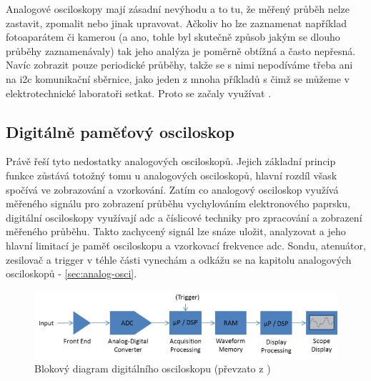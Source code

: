 \documentclass[12pt]{article}
\begin{document}
Analogové osciloskopy mají zásadní nevýhodu
a to tu, že měřený průběh nelze zastavit, zpomalit nebo jinak upravovat. Ačkoliv ho lze
zaznamenat například fotoaparátem či kamerou (a ano, tohle byl skutečně způsob jakým se
dlouho průběhy zaznamenávaly) tak jeho analýza je poměrně obtížná a často nepřesná.
Navíc zobrazit pouze periodické průběhy, takže se s nimi nepodíváme třeba ani na
\gls{i2c} komunikační sběrnice, jako jeden z mnoha příkladů s čimž se můžeme v elektrotechnické
laboratoři setkat. Proto se začaly využívat .

\subsection{Digitálně paměťový osciloskop}

Právě  řeší tyto nedostatky analogových osciloskopů. Jejich základní princip
funkce zůstává totožný tomu u analogových osciloskopů, hlavní rozdíl všask spočívá ve zobrazování
a vzorkování. Zatím co analogový osciloskop využívá měřeného signálu pro zobrazení průběhu
vychylováním elektronového paprsku, digitální osciloskopy využívají \acrfull{adc} a
číslicové techniky pro zpracování a zobrazení měřeného průběhu. Takto zachycený signál
lze snáze uložit, analyzovat a jeho hlavní limitací je paměť osciloskopu a vzorkovací frekvence
\acrshort{adc}. Sondu, atenuátor, zesilovač a trigger v téhle části vynechám a odkážu se na
kapitolu analogových osciloskopů - \ref{sec:analog-osci}.

\begin{figure}[h]
    \centering
    \includegraphics[width=\textwidth]{digital-oscilloscope-diagram}
    \caption{Blokový diagram digitálního osciloskopu (převzato z \cite{SampleProcessingDigital})}
    \label{fig:blok-digital-osci}
\end{figure}
\end{document}

